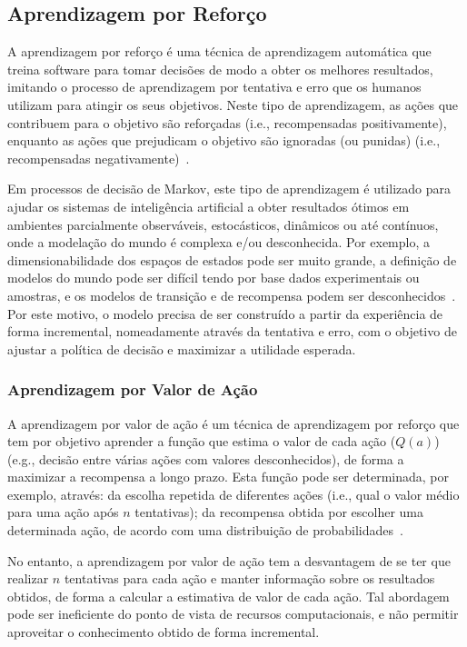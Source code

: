 \subsection{Aprendizagem por Reforço}\label{subsec:aprendizagem-por-reforco}

A aprendizagem por reforço é uma técnica de aprendizagem automática que treina software para tomar decisões de modo a obter os melhores resultados, imitando o processo de aprendizagem por tentativa e erro que os humanos utilizam para atingir os seus objetivos.
Neste tipo de aprendizagem, as ações que contribuem para o objetivo são reforçadas (i.e., recompensadas positivamente), enquanto as ações que prejudicam o objetivo são ignoradas (ou punidas) (i.e., recompensadas negativamente)~\cite{aprendizagem-por-reforco}.

Em processos de decisão de Markov, este tipo de aprendizagem é utilizado para ajudar os sistemas de inteligência artificial a obter resultados ótimos em ambientes parcialmente observáveis, estocásticos, dinâmicos ou até contínuos, onde a modelação do mundo é complexa e/ou desconhecida.
Por exemplo, a dimensionabilidade dos espaços de estados pode ser muito grande, a definição de modelos do mundo pode ser difícil tendo por base dados experimentais ou amostras, e os modelos de transição e de recompensa podem ser desconhecidos~\cite{isel:iasa:slides:aprendizagem-por-reforco}.
Por este motivo, o modelo precisa de ser construído a partir da experiência de forma incremental, nomeadamente através da tentativa e erro, com o objetivo de ajustar a política de decisão e maximizar a utilidade esperada.

\subsubsection{Aprendizagem por Valor de Ação}\label{subsubsec:aprendizagem-por-valor-acao}

A aprendizagem por valor de ação é um técnica de aprendizagem por reforço que tem por objetivo aprender a função que estima o valor de cada ação ($Q(a)$) (e.g., decisão entre várias ações com valores desconhecidos), de forma a maximizar a recompensa a longo prazo.
Esta função pode ser determinada, por exemplo, através: da escolha repetida de diferentes ações (i.e., qual o valor médio para uma ação após $n$ tentativas); da recompensa obtida por escolher uma determinada ação, de acordo com uma distribuição de probabilidades~\cite{isel:iasa:slides:aprendizagem-por-reforco}.

No entanto, a aprendizagem por valor de ação tem a desvantagem de se ter que realizar $n$ tentativas para cada ação e manter informação sobre os resultados obtidos, de forma a calcular a estimativa de valor de cada ação.
Tal abordagem pode ser ineficiente do ponto de vista de recursos computacionais, e não permitir aproveitar o conhecimento obtido de forma incremental.

